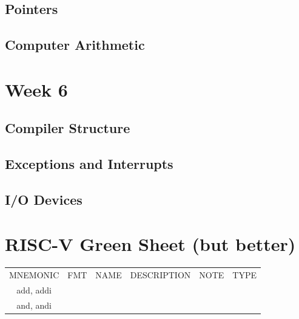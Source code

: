 \documentclass{article}
\begin{document}
\subsection{Pointers}
\subsection{Computer Arithmetic}
\section{Week 6}
\subsection{Compiler Structure}
\subsection{Exceptions and Interrupts}
\subsection{I/O Devices}


\newpage 
\section{RISC-V Green Sheet (but better)}
\begin{tabular}{c|c|c|c|c|c}
		MNEMONIC & FMT & NAME & DESCRIPTION & NOTE & TYPE\\
		add, addi & \\
		and, andi
	\end{tabular}
	
	
\end{document}
